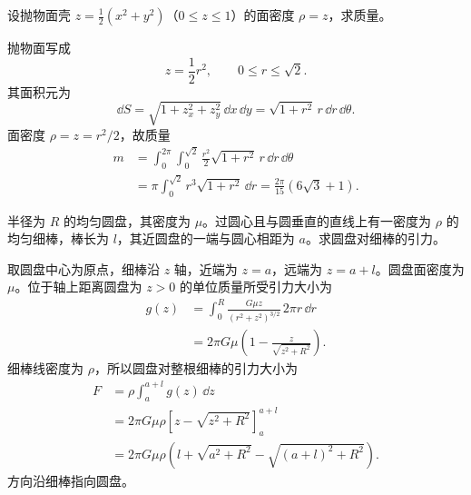 \begin{xexercise}[3]
设抛物面壳 $z=\frac12(x^2+y^2)$（$0\le z\le1$）的面密度 $\rho=z$，求质量。
\end{xexercise}
\begin{xsolution}
抛物面写成
\[
 z=\frac12r^2,
 \qquad0\le r\le\sqrt2.
\]
其面积元为
\[
 \dd S=\sqrt{1+z_x^2+z_y^2}\,\dd x\,\dd y
 =\sqrt{1+r^2}\,r\,\dd r\,\dd\theta.
\]
面密度 $\rho=z=r^2/2$，故质量
\begin{align*}
 m&=\int_0^{2\pi}\int_0^{\sqrt2}
 \frac{r^2}{2}\sqrt{1+r^2}\,r\,\dd r\,\dd\theta\\
 &=\pi\int_0^{\sqrt2}r^3\sqrt{1+r^2}\,\dd r
 =\boxed{\frac{2\pi}{15}(6\sqrt3+1)}.
\end{align*}
\end{xsolution}


\begin{xexercise}[4]
半径为 $R$ 的均匀圆盘，其密度为 $\mu$。过圆心且与圆垂直的直线上有一密度为 $\rho$ 的均匀细棒，棒长为 $l$，其近圆盘的一端与圆心相距为 $a$。求圆盘对细棒的引力。
\end{xexercise}
\begin{xsolution}
取圆盘中心为原点，细棒沿 $z$ 轴，近端为 $z=a$，远端为 $z=a+l$。圆盘面密度为 $\mu$。位于轴上距离圆盘为 $z>0$ 的单位质量所受引力大小为
\begin{align*}
 g(z)&=\int_0^R\frac{G\mu z}{(r^2+z^2)^{3/2}}\,2\pi r\,\dd r\\
 &=2\pi G\mu\left(1-\frac{z}{\sqrt{z^2+R^2}}\right).
\end{align*}
细棒线密度为 $\rho$，所以圆盘对整根细棒的引力大小为
\begin{align*}
 F&=\rho\int_a^{a+l}g(z)\,\dd z\\
 &=2\pi G\mu\rho
 \left[z-\sqrt{z^2+R^2}\right]_{a}^{a+l}\\
 &=\boxed{2\pi G\mu\rho
 \left(l+\sqrt{a^2+R^2}-\sqrt{(a+l)^2+R^2}\right)}.
\end{align*}
方向沿细棒指向圆盘。
\end{xsolution}


